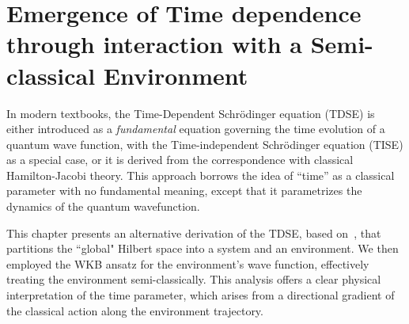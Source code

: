 \chapter[Time Emergence from Quantum-Classical Interactions
]{Emergence of Time dependence 
through interaction with a Semi-classical Environment\label{chap:briggs_rost_semiclassic}}

In modern textbooks, the Time-Dependent Schr\"odinger equation (TDSE) is either introduced as a \emph{fundamental}
equation governing the time evolution of a quantum wave function, with the Time-independent Schr\"odinger
equation (TISE) as a special case, or it is derived from the correspondence with classical Hamilton-Jacobi 
theory. This approach borrows the idea of ``time'' as a classical parameter with no fundamental 
meaning, except that it parametrizes the dynamics of the quantum wavefunction. 

This chapter presents an alternative derivation of the TDSE, based on~\cite{briggs2001derivation}, that partitions
the ``global" Hilbert space into a system and an environment. We then employed the WKB ansatz 
for the environment's wave function, effectively treating the environment semi-classically. 
This analysis offers a clear physical interpretation of the time parameter, which arises from a directional gradient of 
the classical action along the environment trajectory.

